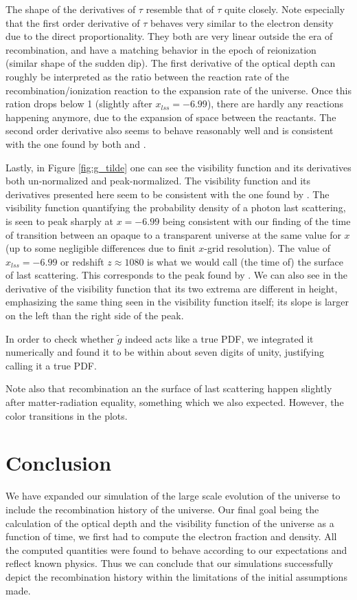 \documentclass[twocolumn]{aastex62}
\begin{document}
The shape of the derivatives of $\tau$ resemble that of $\tau$ quite closely. Note especially that the first order derivative of $\tau$ behaves very similar to the electron density due to the direct proportionality. They both are very linear outside the era of recombination, and have a matching behavior in the epoch of reionization (similar shape of the sudden dip). The first derivative of the optical depth can roughly be interpreted as the ratio between the reaction rate of the recombination/ionization reaction to the expansion rate of the universe. Once this ration drops below 1 (slightly after $x_{lss} = -6.99$), there are hardly any reactions happening anymore, due to the expansion of space between the reactants. The second order derivative also seems to behave reasonably well and is consistent with the one found by both \cite{callin:2006} and \cite{winther:2020}.  

Lastly, in Figure \ref{fig:g_tilde} one can see the visibility function and its derivatives both un-normalized and peak-normalized. The visibility function and its derivatives presented here seem to be consistent with the one found by \cite{callin:2006}. The visibility function quantifying the probability density of a photon last scattering, is seen to peak sharply at $x = -6.99$ being consistent with our finding of the time of transition between an opaque to a transparent universe at the same value for $x$ (up to some negligible differences due to finit $x$-grid resolution). The value of $x_{lss} = -6.99$ or redshift $z \approx 1080$ is what we would call (the time of) the surface of last scattering. This corresponds to the peak found by \cite{callin:2006}. We can also see in the derivative of the visibility function that its two extrema are different in height, emphasizing the same thing seen in the visibility function itself; its slope is larger on the left than the right side of the peak.  

In order to check whether $\tilde{g}$ indeed acts like a true PDF, we integrated it numerically and found it to be within about seven digits of unity, justifying calling it a true PDF.

Note also that recombination an the surface of last scattering happen slightly after matter-radiation equality, something which we also expected. However, the color transitions in the plots.

\section{Conclusion} \label{sec:Conclusion}
We have expanded our simulation of the large scale evolution of the universe to include the recombination history of the universe. Our final goal being the calculation of the optical depth and the visibility function of the universe as a function of time, we first had to compute the electron fraction and density. All the computed quantities were found to behave according to our expectations and reflect known physics. Thus we can conclude that our simulations successfully depict the recombination history within the limitations of the initial assumptions made.
\newpage


\end{document}
